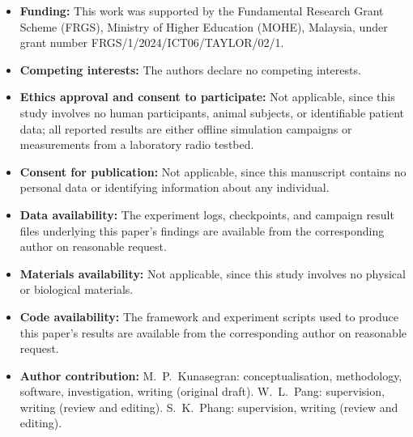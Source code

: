 \documentclass[pdflatex,sn-basic,Numbered]{sn-jnl}%
\begin{document}
\begin{itemize}
\item \textbf{Funding:} This work was supported by the Fundamental Research Grant Scheme (FRGS), Ministry of Higher Education (MOHE), Malaysia, under grant number FRGS/1/2024/ICT06/TAYLOR/02/1.
\item \textbf{Competing interests:} The authors declare no competing interests.
\item \textbf{Ethics approval and consent to participate:} Not applicable, since this study involves no human participants, animal subjects, or identifiable patient data; all reported results are either offline simulation campaigns or measurements from a laboratory radio testbed.
\item \textbf{Consent for publication:} Not applicable, since this manuscript contains no personal data or identifying information about any individual.
\item \textbf{Data availability:} The experiment logs, checkpoints, and campaign result files underlying this paper's findings are available from the corresponding author on reasonable request.
\item \textbf{Materials availability:} Not applicable, since this study involves no physical or biological materials.
\item \textbf{Code availability:} The framework and experiment scripts used to produce this paper's results are available from the corresponding author on reasonable request.
\item \textbf{Author contribution:} M.\ P.\ Kunasegran: conceptualisation, methodology, software, investigation, writing (original draft). W.\ L.\ Pang: supervision, writing (review and editing). S.\ K.\ Phang: supervision, writing (review and editing).
\end{itemize}


\end{document}
